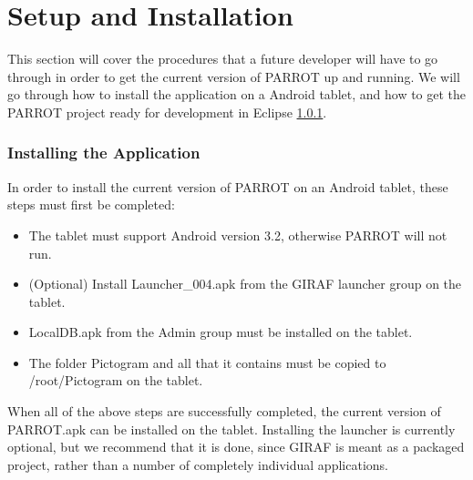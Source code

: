 \chapter{Setup and Installation}
This section will cover the procedures that a future developer will have to go through in order to get the current version of PARROT up and running.
We will go through how to install the application on a Android tablet, and how to get the PARROT project ready for development in Eclipse \ref{}.\newline

\subsection{Installing the Application}
In order to install the current version of PARROT on an Android tablet, these steps must first be completed:
\begin{itemize}
	\item The tablet must support Android version 3.2, otherwise PARROT will not run.
	\item (Optional) Install Launcher\_004.apk from the GIRAF launcher group on the tablet.
	\item LocalDB.apk from the Admin group must be installed on the tablet.
	\item The folder Pictogram and all that it contains must be copied to /root/Pictogram on the tablet.
\end{itemize}
When all of the above steps are successfully completed, the current version of PARROT.apk can be installed on the tablet.
Installing the launcher is currently optional, but we recommend that it is done, since GIRAF is meant as a packaged project, rather than a number of completely individual applications.

